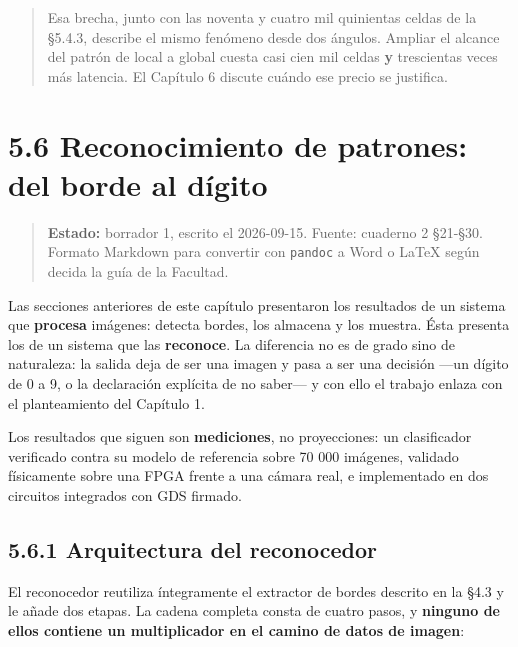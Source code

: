 \begin{quote}
Esa brecha, junto con las noventa y cuatro mil quinientas celdas de la
§5.4.3, describe el mismo fenómeno desde dos ángulos. Ampliar el alcance
del patrón de local a global cuesta casi cien mil celdas \textbf{y}
trescientas veces más latencia. El Capítulo 6 discute cuándo ese precio
se justifica.
\end{quote}

\section{5.6 Reconocimiento de patrones: del borde al
dígito}\label{reconocimiento-de-patrones-del-borde-al-duxedgito}

\begin{quote}
\textbf{Estado:} borrador 1, escrito el 2026-09-15. Fuente: cuaderno 2
§21-§30. Formato Markdown para convertir con \texttt{pandoc} a Word o
LaTeX según decida la guía de la Facultad.
\end{quote}

Las secciones anteriores de este capítulo presentaron los resultados de
un sistema que \textbf{procesa} imágenes: detecta bordes, los almacena y
los muestra. Ésta presenta los de un sistema que las \textbf{reconoce}.
La diferencia no es de grado sino de naturaleza: la salida deja de ser
una imagen y pasa a ser una decisión ---un dígito de 0 a 9, o la
declaración explícita de no saber--- y con ello el trabajo enlaza con el
planteamiento del Capítulo 1.

Los resultados que siguen son \textbf{mediciones}, no proyecciones: un
clasificador verificado contra su modelo de referencia sobre 70 000
imágenes, validado físicamente sobre una FPGA frente a una cámara real,
e implementado en dos circuitos integrados con GDS firmado.

\subsection{5.6.1 Arquitectura del
reconocedor}\label{arquitectura-del-reconocedor}

El reconocedor reutiliza íntegramente el extractor de bordes descrito en
la §4.3 y le añade dos etapas. La cadena completa consta de cuatro
pasos, y \textbf{ninguno de ellos contiene un multiplicador en el camino
de datos de imagen}:

